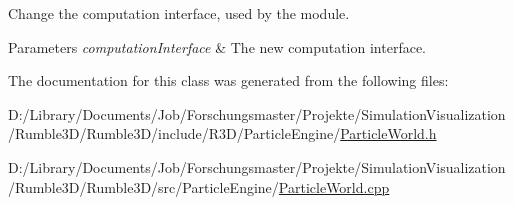Change the computation interface, used by the module. 


\begin{DoxyParams}{Parameters}
{\em computation\+Interface} & The new computation interface. \\
\hline
\end{DoxyParams}


The documentation for this class was generated from the following files\+:\begin{DoxyCompactItemize}
\item 
D\+:/\+Library/\+Documents/\+Job/\+Forschungsmaster/\+Projekte/\+Simulation\+Visualization/\+Rumble3\+D/\+Rumble3\+D/include/\+R3\+D/\+Particle\+Engine/\mbox{\hyperlink{_particle_world_8h}{Particle\+World.\+h}}\item 
D\+:/\+Library/\+Documents/\+Job/\+Forschungsmaster/\+Projekte/\+Simulation\+Visualization/\+Rumble3\+D/\+Rumble3\+D/src/\+Particle\+Engine/\mbox{\hyperlink{_particle_world_8cpp}{Particle\+World.\+cpp}}\end{DoxyCompactItemize}
